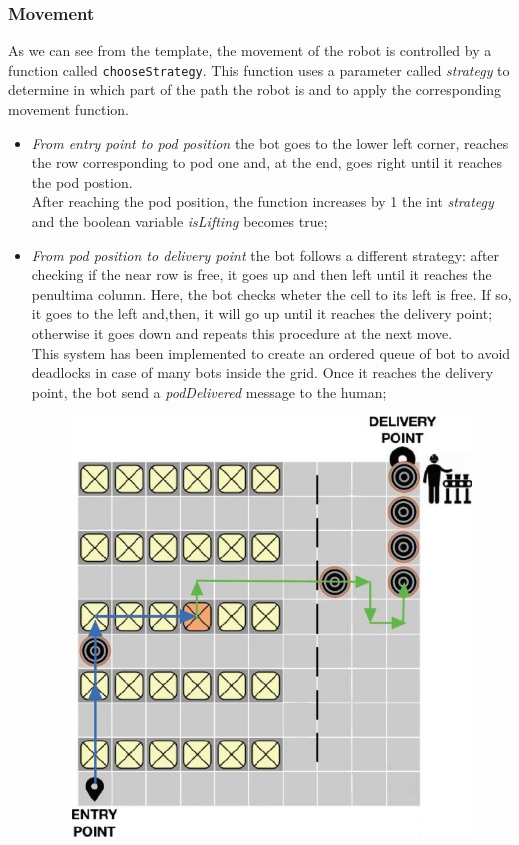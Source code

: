\documentclass{article}
\begin{document}
			\subsubsection{Movement}
				As we can see from the template, the movement of the robot is controlled by a function called \verb|chooseStrategy|. This function uses a parameter called \emph{strategy} to determine in which part of the path the robot is and to apply the corresponding movement function.\\
				\begin{itemize}
					\item \emph{From entry point to pod position} the bot goes to the lower left corner, reaches the row corresponding to pod one and, at the end, goes right until it reaches the pod postion.\\After reaching the pod position, the function increases by 1 the int \emph{strategy} and the boolean variable \emph{isLifting} becomes true;
					\item \emph{From pod position to delivery point} the bot follows a different strategy: after checking if the near row is free, it goes up and then left until it reaches the penultima column. Here, the bot checks wheter the cell to its left is free. If so, it goes to the left and,then, it will go up until it reaches the delivery point; otherwise it goes down and repeats this procedure at the next move.\\This system has been implemented to create an ordered queue of bot to avoid deadlocks in case of many bots inside the grid. Once it reaches the delivery point, the bot send a \emph{podDelivered} message to the human;
					\begin{figure}[ht]
						\centering
						\includegraphics[scale = 0.38]{Images/BotMovement1.JPG}

\end{figure}
\end{itemize}
\end{document}
